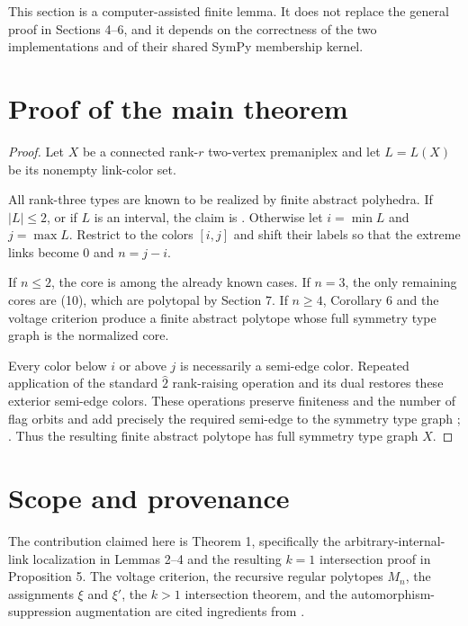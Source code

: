 \documentclass[11pt]{article}
\begin{document}
This section is a computer-assisted finite lemma. It does not replace the general proof in Sections
4--6, and it depends on the correctness of the two implementations and of their shared SymPy
membership kernel.


\section{Proof of the main theorem}

\begin{proof}

Let $X$ be a connected rank-$r$ two-vertex premaniplex and let $L=L(X)$ be its nonempty link-color
set.

All rank-three types are known to be realized by finite abstract polyhedra. If $|L|\leq2$, or if
$L$ is an interval, the claim is \cite[Theorem 6.9]{mochan2024}. Otherwise let $i=\min L$ and $j=\max L$.
Restrict to the colors $[i,j]$ and shift their labels so that the extreme links become $0$ and
$n=j-i$.

If $n\leq2$, the core is among the already known cases. If $n=3$, the only remaining cores are
(10), which are polytopal by Section 7. If $n\geq4$, Corollary 6 and the voltage criterion produce a
finite abstract polytope whose full symmetry type graph is the normalized core.

Every color below $i$ or above $j$ is necessarily a semi-edge color. Repeated application of the
standard $\widehat2$ rank-raising operation and its dual restores these exterior semi-edge colors.
These operations preserve finiteness and the number of flag orbits and add precisely the required
semi-edge to the symmetry type graph \cite[Section 4]{mochan2024}; \cite[Proposition 11]{ppt2019}. Thus the resulting finite
abstract polytope has full symmetry type graph $X$.
\end{proof}


\section{Scope and provenance}

The contribution claimed here is Theorem 1, specifically the arbitrary-internal-link localization
in Lemmas 2--4 and the resulting $k=1$ intersection proof in Proposition 5. The voltage criterion,
the recursive regular polytopes $M_n$, the assignments $\xi$ and $\xi'$, the $k>1$ intersection
theorem, and the automorphism-suppression augmentation are cited ingredients from \cite{hm2023,mochan2024,ppt2019}.
\end{document}
